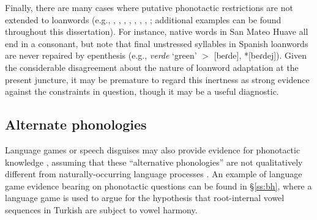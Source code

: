 
Finally, there are many cases where putative phonotactic restrictions are not extended to loanwords (e.g., \citealt{Clements1982}, \citealt[75]{Davidson1997}, \citealt{Fries1949}, \citealt{Holden1976}, \citealt{Ito1995a,Ito1995b}, \citealt[95]{Shibatani1973}, \citealt{Ussishkin2003}, \citealt{Vogt1954}; additional examples can be found throughout this dissertation).
For instance, native words in San Mateo Huave all end in a consonant, but 
\citet{Davidson1997} note that final unstressed syllables in Spanish loanwords are never repaired by epenthesis (e.g., \emph{verde} `green' $>$ [beɾde], *[beɾdej]).
Given the considerable disagreement about the nature of loanword adaptation at the present juncture, it may be premature to regard this inertness as strong evidence against the constraints in question, though it may be a useful diagnostic.

\subsection{Alternate phonologies}

Language games or speech disguises may also provide evidence for phonotactic knowledge \citep[e.g.,][]{Vaux2011}, assuming that these ``alternative phonologies'' are not qualitatively different from naturally-occurring language processes \citep[e.g.,][697]{Bagemihl1995}.
An example of language game evidence bearing on phonotactic questions can be found in \S\ref{ss:bh}, where a language game is used to argue for the hypothesis that root-internal vowel sequences in Turkish are subject to vowel harmony.

